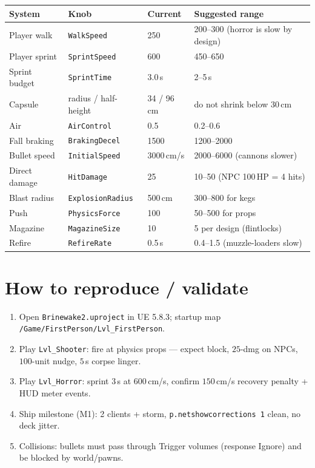 \documentclass[11pt,a4paper]{article}
\begin{document}
\begin{center}
\begin{tabular}{@{}llll@{}}
\toprule
System & Knob & Current & Suggested range \\
\midrule
Player walk & \texttt{WalkSpeed} & 250 & 200--300 (horror is slow by design) \\
Player sprint & \texttt{SprintSpeed} & 600 & 450--650 \\
Sprint budget & \texttt{SprintTime} & 3.0\,s & 2--5\,s \\
Capsule & radius / half-height & 34 / 96\,cm & do not shrink below 30\,cm \\
Air & \texttt{AirControl} & 0.5 & 0.2--0.6 \\
Fall braking & \texttt{BrakingDecel} & 1500 & 1200--2000 \\
Bullet speed & \texttt{InitialSpeed} & 3000\,cm/s & 2000--6000 (cannons slower) \\
Direct damage & \texttt{HitDamage} & 25 & 10--50 (NPC 100\,HP = 4 hits) \\
Blast radius & \texttt{ExplosionRadius} & 500\,cm & 300--800 for kegs \\
Push & \texttt{PhysicsForce} & 100 & 50--500 for props \\
Magazine & \texttt{MagazineSize} & 10 & 5 per design (flintlocks) \\
Refire & \texttt{RefireRate} & 0.5\,s & 0.4--1.5 (muzzle-loaders slow) \\
\bottomrule
\end{tabular}
\end{center}

\section{How to reproduce / validate}
\label{sec:repro}

\begin{enumerate}[leftmargin=1.4em]
  \item Open \texttt{Brinewake2.uproject} in UE 5.8.3; startup map \texttt{/Game/FirstPerson/Lvl\_FirstPerson}.
  \item Play \texttt{Lvl\_Shooter}: fire at physics props --- expect block, $25$-dmg on NPCs, $100$-unit nudge, $5$\,s corpse linger.
  \item Play \texttt{Lvl\_Horror}: sprint $3$\,s at $600$\,cm/s, confirm $150$\,cm/s recovery penalty + HUD meter events.
  \item Ship milestone (M1): 2 clients + storm, \texttt{p.netshowcorrections 1} clean, no deck jitter.
  \item Collisions: bullets must pass through Trigger volumes (response Ignore) and be blocked by world/pawns.
\end{enumerate}
\end{document}
